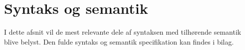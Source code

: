\section{Syntaks og semantik}\label{sec:Syntax}
I dette afsnit vil de mest relevante dele af syntaksen med tilhørende semantik blive belyst. Den fulde syntaks og semantik specifikation kan findes i bilag. 


